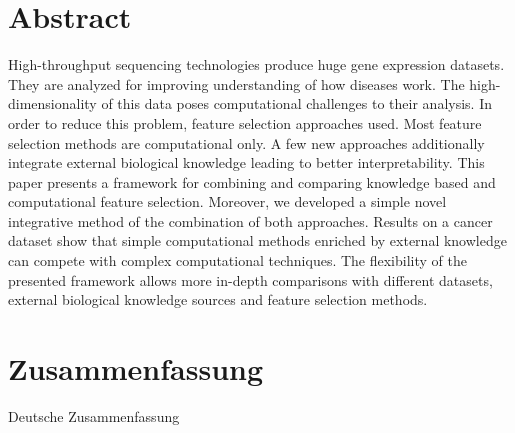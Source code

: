 \chapter*{Abstract}

High-throughput sequencing technologies produce huge gene expression datasets. 
They are analyzed for improving understanding of how diseases work.
The high-dimensionality of this data poses computational challenges to their analysis.
In order to reduce this problem, feature selection approaches used.
Most feature selection methods are computational only.
A few new approaches additionally integrate external biological knowledge leading to better interpretability.
This paper presents a framework for combining and comparing knowledge based and computational feature selection. 
Moreover, we developed a simple novel integrative method of the combination of both approaches. 
Results on a cancer dataset show that simple computational methods enriched by external knowledge can compete with complex computational techniques. 
The flexibility of the presented framework allows more in-depth comparisons with different datasets, external biological knowledge sources and feature selection methods.

\chapter*{Zusammenfassung}

Deutsche Zusammenfassung
